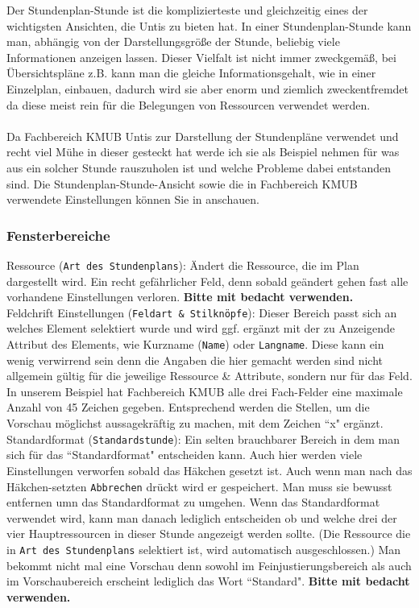 Der Stundenplan-Stunde ist die komplizierteste und gleichzeitig eines der wichtigsten Ansichten, die Untis zu bieten hat. In einer Stundenplan-Stunde kann man, abhängig von der Darstellungsgröße der Stunde, beliebig viele Informationen anzeigen lassen. Dieser Vielfalt ist nicht immer zweckgemäß, bei Übersichtspläne z.B. kann man die gleiche Informationsgehalt, wie in einer Einzelplan, einbauen, dadurch wird sie aber enorm und ziemlich zweckentfremdet da diese meist rein für die Belegungen von Ressourcen verwendet werden.\\
\\
Da Fachbereich KMUB Untis zur Darstellung der Stundenpläne verwendet und recht viel Mühe in dieser gesteckt hat werde ich sie als Beispiel nehmen für was aus ein solcher Stunde rauszuholen ist und welche Probleme dabei entstanden sind. Die Stundenplan-Stunde-Ansicht sowie die in Fachbereich KMUB verwendete Einstellungen können Sie in  anschauen.

\subsubsection{Fensterbereiche}

\noindent
Ressource (\texttt{Art des Stundenplans}): Ändert die Ressource, die im Plan dargestellt wird. Ein recht gefährlicher Feld, denn sobald geändert gehen fast alle vorhandene Einstellungen verloren. \textbf{Bitte mit bedacht verwenden.}\\

\noindent
Feldchrift Einstellungen (\texttt{Feldart \& Stilknöpfe}): Dieser Bereich passt sich an welches Element selektiert wurde und wird ggf. ergänzt mit der zu Anzeigende Attribut des Elements, wie Kurzname (\texttt{Name}) oder \texttt{Langname}. Diese kann ein wenig verwirrend sein denn die Angaben die hier gemacht werden sind nicht allgemein gültig für die jeweilige Ressource \& Attribute, sondern nur für das Feld. In unserem Beispiel hat Fachbereich KMUB alle drei Fach-Felder eine maximale Anzahl von 45 Zeichen gegeben. Entsprechend werden die Stellen, um die Vorschau möglichst aussagekräftig zu machen, mit dem Zeichen ``x" \hspace{1pt} ergänzt.\\

\noindent
Standardformat (\texttt{Standardstunde}): Ein selten brauchbarer Bereich in dem man sich für das ``Standardformat" \hspace{1pt} entscheiden kann. Auch hier werden viele Einstellungen verworfen sobald das Häkchen gesetzt ist. Auch wenn man nach das Häkchen-setzten \texttt{Abbrechen} drückt wird er gespeichert. Man muss sie bewusst entfernen umn das Standardformat zu umgehen. Wenn das Standardformat verwendet wird, kann man danach lediglich entscheiden ob und welche drei der vier Hauptressourcen in dieser Stunde angezeigt werden sollte. (Die Ressource die in \texttt{Art des Stundenplans} selektiert ist, wird automatisch ausgeschlossen.) Man bekommt nicht mal eine Vorschau denn sowohl im Feinjustierungsbereich als auch im Vorschaubereich erscheint lediglich das Wort ``Standard". \textbf{Bitte mit bedacht verwenden.}\\


